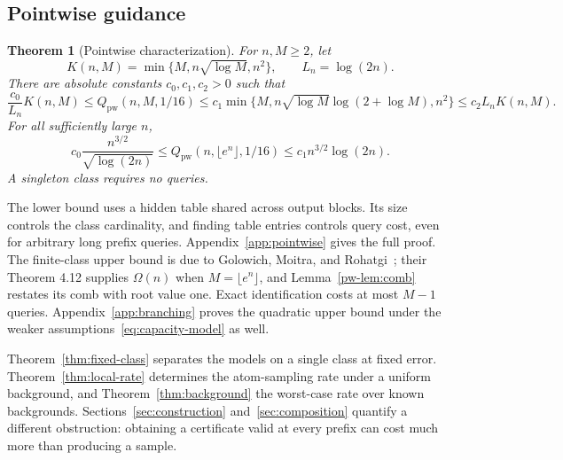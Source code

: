 \documentclass[11pt]{article}
\newtheorem{theorem}{Theorem}[section]
\theoremstyle{definition}\newtheorem{definition}[theorem]{Definition}
\theoremstyle{remark}\newtheorem{remark}[theorem]{Remark}
\begin{document}
\subsection{Pointwise guidance}
\begin{theorem}[Pointwise characterization]\label{thm:pointwise}
For $n,M\ge2$, let
\begin{equation}\label{eq:K}
 K(n,M)=\min\{M,n\sqrt{\log M},n^2\},\qquad L_n=\log(2n).
\end{equation}
There are absolute constants $c_0,c_1,c_2>0$ such that
\begin{equation}\label{eq:pw-main}
 \frac{c_0}{L_n}K(n,M)\le Q_{\mathrm{pw}}(n,M,1/16)
 \le c_1\min\{M,n\sqrt{\log M}\log(2+\log M),n^2\}
 \le c_2 L_n K(n,M).
\end{equation}
For all sufficiently large $n$,
\begin{equation}\label{eq:pw-expn}
 c_0\frac{n^{3/2}}{\sqrt{\log(2n)}}
 \le Q_{\mathrm{pw}}(n,\lfloor e^n\rfloor,1/16)
 \le c_1 n^{3/2}\log(2n).
\end{equation}
A singleton class requires no queries.
\end{theorem}
The lower bound uses a hidden table shared across output blocks. Its size controls the class cardinality, and finding table entries controls query cost, even for arbitrary long prefix queries. Appendix~\ref{app:pointwise} gives the full proof. The finite-class upper bound is due to Golowich, Moitra, and Rohatgi~\cite[Theorem 3.2]{gmr}; their Theorem 4.12 supplies $\Omega(n)$ when $M=\lfloor e^n\rfloor$, and Lemma~\ref{pw-lem:comb} restates its comb with root value one. Exact identification costs at most $M-1$ queries. Appendix~\ref{app:branching} proves the quadratic upper bound under the weaker assumptions~\eqref{eq:capacity-model} as well.

Theorem~\ref{thm:fixed-class} separates the models on a single class at fixed error. Theorem~\ref{thm:local-rate} determines the atom-sampling rate under a uniform background, and Theorem~\ref{thm:background} the worst-case rate over known backgrounds. Sections~\ref{sec:construction} and~\ref{sec:composition} quantify a different obstruction: obtaining a certificate valid at every prefix can cost much more than producing a sample.
\end{document}
